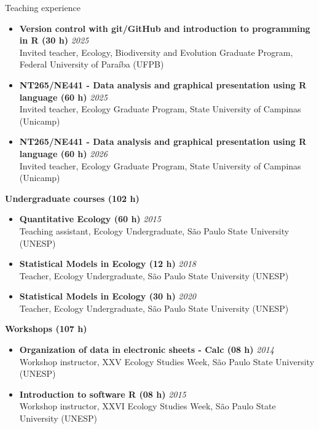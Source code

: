 \documentclass{resume}
\begin{document}
\begin{rSection}{Teaching experience}
\begin{itemize}
\item \textbf{Version control with git/GitHub and introduction to programming in R (30 h)} \hfill{\em 2025}\\
Invited teacher, Ecology, Biodiversity and Evolution Graduate Program, Federal University of Paraíba (UFPB)

\item \textbf{NT265/NE441 - Data analysis and graphical presentation using R language (60 h)} \hfill{\em 2025}\\
Invited teacher, Ecology Graduate Program, State University of Campinas (Unicamp)

\item \textbf{NT265/NE441 - Data analysis and graphical presentation using R language (60 h)} \hfill{\em 2026}\\
Invited teacher, Ecology Graduate Program, State University of Campinas (Unicamp)
\end{itemize}

\textbf{Undergraduate courses (102 h)}
\begin{itemize}
\item \textbf{Quantitative Ecology (60 h)} \hfill{\em 2015}\\
Teaching assistant, Ecology Undergraduate, São Paulo State University (UNESP)

\item \textbf{Statistical Models in Ecology (12 h)} \hfill{\em 2018}\\
Teacher, Ecology Undergraduate, São Paulo State University (UNESP)

\item \textbf{Statistical Models in Ecology (30 h)} \hfill{\em 2020}\\
Teacher, Ecology Undergraduate, São Paulo State University (UNESP)

\end{itemize}

\textbf{Workshops (107 h)}
\begin{itemize}
\item \textbf{Organization of data in electronic sheets - Calc (08 h)} \hfill{\em 2014}\\
Workshop instructor, XXV Ecology Studies Week, São Paulo State University (UNESP) 

\item \textbf{Introduction to software R (08 h)} \hfill{\em 2015}\\
Workshop instructor, XXVI Ecology Studies Week, São Paulo State University (UNESP) 


\end{itemize}
\end{rSection}
\end{document}
